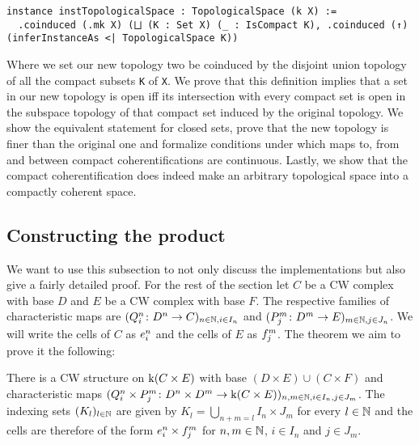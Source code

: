 \begin{lstlisting}[frame=single]
instance instTopologicalSpace : TopologicalSpace (k X) :=
  .coinduced (.mk X) (⨆ (K : Set X) (_ : IsCompact K), .coinduced (↑) (inferInstanceAs <| TopologicalSpace K))
\end{lstlisting}

Where we set our new topology two be coinduced by the disjoint union topology of all the compact subsets \lstinline|K| of \lstinline|X|. 
We prove that this definition implies that a set in our new topology is open iff its intersection with every compact set is open in the subspace topology of that compact set induced by the original topology. 
We show the equivalent statement for closed sets, prove that the new topology is finer than the original one and formalize conditions under which maps to, from and between compact coherentifications are continuous. 
Lastly, we show that the compact coherentification does indeed make an arbitrary topological space into a compactly coherent space. 

\subsection{Constructing the product}


We want to use this subsection to not only discuss the implementations but also give a fairly detailed proof. 
For the rest of the section let $C$ be a CW complex with base $D$ and $E$ be a CW complex with base $F$.
The respective families of characteristic maps are $(Q_i^n \colon D^n \to C)_{n \in \bN, i \in I_n}$ and $(P_j^m \colon D^m \to E)_{m \in \bN, j \in J_n}$. 
We will write the cells of $C$ as $\openCell{n}{i}$ and the cells of $E$ as $\openCellf{m}{j}$.
The theorem we aim to prove it the following:

\begin{thm}
  There is a CW structure on $\kif (C \times E)$ with base $(D \times E) \cup (C \times F)$ and characteristic maps $(Q_i^n \times P_j^m \colon D^n \times D^m \to \kif(C \times E))_{n,m \in \bN,i \in I_n,j \in J_m}$.
  The indexing sets $(K_l)_{l \in \bN}$ are given by $K_l = \bigcup_{n + m = l}I_n \times J_m$ for every $l \in \bN$ and the cells are therefore of the form $\openCell{n}{i} \times \openCellf{m}{j}$ for $n, m \in \bN$, $i \in I_n$ and $j \in J_m$.
\end{thm}

